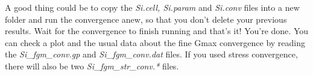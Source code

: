 \documentclass[10pt]{article}
\begin{document}
A good thing could be to copy the \textit{Si.cell, Si.param} and \textit{Si.conv} files into a new folder and run the convergence anew, so that you don't delete your previous results. Wait for the convergence to finish running and that's it! You're done. You can check a plot and the usual data about the fine Gmax convergence by reading the \textit{Si\_fgm\_conv.gp} and \textit{Si\_fgm\_conv.dat} files. If you used stress convergence, there will also be two \textit{Si\_fgm\_str\_conv.*} files.
\end{document}

